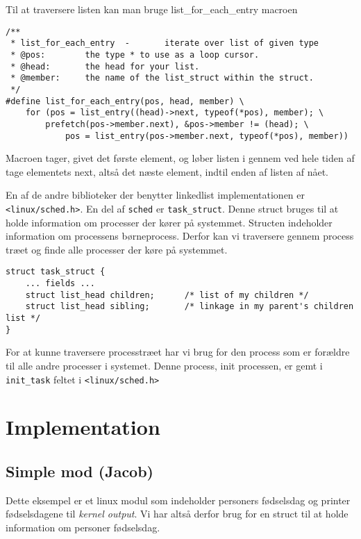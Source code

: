 \documentclass[danish]{report}
\begin{document}
Til at traversere listen kan man bruge list\_for\_each\_entry macroen

\begin{lstlisting}
/**
 * list_for_each_entry  -       iterate over list of given type
 * @pos:        the type * to use as a loop cursor.
 * @head:       the head for your list.
 * @member:     the name of the list_struct within the struct.
 */
#define list_for_each_entry(pos, head, member) \
    for (pos = list_entry((head)->next, typeof(*pos), member); \
        prefetch(pos->member.next), &pos->member != (head); \
            pos = list_entry(pos->member.next, typeof(*pos), member))
\end{lstlisting}

Macroen tager, givet det første element, og løber listen i gennem ved hele tiden af tage elementets next, altså det næste element, indtil enden af listen af nået.

En af de andre biblioteker der benytter linkedlist implementationen er \texttt{<linux/sched.h>}. En del af \texttt{sched} er \texttt{task\_struct}. Denne struct bruges til at holde information om processer der kører på systemmet. Structen indeholder information om processens børneprocess. Derfor kan vi traversere gennem process træet og finde alle processer der køre på systemmet.

\begin{lstlisting}
struct task_struct {
    ... fields ...
    struct list_head children;      /* list of my children */
    struct list_head sibling;       /* linkage in my parent's children list */
}
\end{lstlisting}

For at kunne traversere processtræet har vi brug for den process som er forældre til alle andre processer i systemet. Denne process, init processen, er gemt i \texttt{init\_task} feltet i \texttt{<linux/sched.h>}


\chapter{Implementation}
\section{Simple mod (Jacob)}

Dette eksempel er et linux modul som indeholder personers fødselsdag og printer fødselsdagene til \textit{kernel output}. Vi har altså derfor brug for en struct til at holde information om personer fødselsdag.
\end{document}
